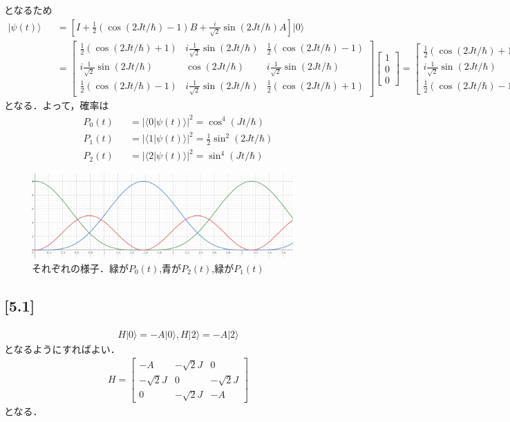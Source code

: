 \documentclass[12pt,dvipdfmx]{jsarticle}
\begin{document}
となるため
\begin{eqnarray}
  |\psi(t)\rangle &&= \left[  I + \frac{1}{2}\left( \cos(2J t/\hbar)-1 \right)B + \frac{i}{\sqrt{2}}\sin(2J t/\hbar)A \right]|0\rangle\\
  &&=
  \begin{bmatrix}
    \frac{1}{2}(\cos(2Jt/\hbar)+1) & i\frac{1}{\sqrt{2}} \sin(2Jt/\hbar) & \frac{1}{2}(\cos(2Jt/\hbar)-1)\\
    i \frac{1}{\sqrt{2}}\sin(2Jt/\hbar) & \cos(2Jt/\hbar) & i \frac{1}{\sqrt{2}}\sin(2Jt/\hbar)\\
    \frac{1}{2}(\cos(2Jt/\hbar)-1) & i \frac{1}{\sqrt{2}}\sin(2Jt/\hbar) & \frac{1}{2}(\cos(2Jt/\hbar)+1)
  \end{bmatrix}
  \begin{bmatrix}
    1\\
    0\\
    0
  \end{bmatrix}
  =
  \begin{bmatrix}
    \frac{1}{2}(\cos(2Jt/\hbar)+1) \\
    i \frac{1}{\sqrt{2}}\sin(2Jt/\hbar)\\
    \frac{1}{2}(\cos(2Jt/\hbar)-1) 
  \end{bmatrix}
\end{eqnarray}
となる．よって，確率は
\begin{eqnarray}
  P_0(t) &&= |\langle 0|\psi(t)\rangle|^2 = \cos^4(Jt/\hbar)\\
  P_1(t) &&= |\langle 1|\psi(t)\rangle|^2 =\frac{1}{2} \sin^2(2Jt/\hbar)\\
  P_2(t) &&= |\langle 2|\psi(t)\rangle|^2 = \sin^4(Jt/\hbar)
\end{eqnarray}

\begin{figure}[H]
  \begin{center}
  \includegraphics[width=100mm]{image.png}
  \caption{それぞれの様子．緑が$P_0(t)$,青が$P_2(t)$,緑が$P_1(t)$}
  \end{center}
\end{figure}
\subsection*{\large{[5.1]}}
\begin{eqnarray}
  H|0\rangle = -A|0\rangle, H|2\rangle = -A|2\rangle
\end{eqnarray}
となるようにすればよい．
\begin{eqnarray}
  H =
  \begin{bmatrix}
    -A & -\sqrt{2}J & 0\\
    -\sqrt{2}J & 0 & -\sqrt{2}J\\
    0 & -\sqrt{2}J & -A
  \end{bmatrix}
\end{eqnarray}
となる．
\end{document}
